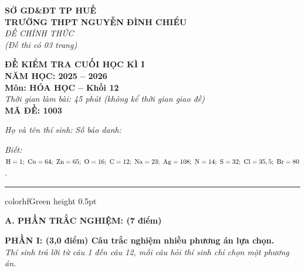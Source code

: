 \documentclass[11pt,a4paper]{article}
\begin{document}
\begin{minipage}[t]{0.48\textwidth}
\textbf{SỞ GD\&ĐT TP HUẾ}\\
\textbf{TRƯỜNG THPT NGUYỄN ĐÌNH CHIỂU}\\
\textit{ĐỀ CHÍNH THỨC}\\
\textit{(Đề thi có 03 trang)}
\end{minipage}
\hfill
\begin{minipage}[t]{0.48\textwidth}
\raggedleft
\textbf{\color{hfRed}ĐỀ KIỂM TRA CUỐI HỌC KÌ I}\\
\textbf{NĂM HỌC: 2025 -- 2026}\\
\textbf{Môn: HÓA HỌC -- Khối 12}\\
\textit{Thời gian làm bài: 45 phút (không kể thời gian giao đề)}\\
\textbf{MÃ ĐỀ: 1003}
\end{minipage}

\vspace{4pt}
\noindent
\textit{Họ và tên thí sinh:} \dotfill \textit{Số báo danh:} \dotfill

\vspace{3pt}
\noindent
\textit{\footnotesize Biết: $\ce{H}=1;\ \ce{Cu}=64;\ \ce{Zn}=65;\ \ce{O}=16;\ \ce{C}=12;\ \ce{Na}=23;\ \ce{Ag}=108;\ \ce{N}=14;\ \ce{S}=32;\ \ce{Cl}=35,5;\ \ce{Br}=80$.}

\vspace{3pt}
\hrule color{hfGreen} height 0.5pt

\vspace{4pt}
\noindent
{\color{mainGreen}\textbf{\Large A. PHẦN TRẮC NGHIỆM: (7 điểm)}}

\vspace{3pt}
\noindent
{\color{mainGreen}\textbf{\large PHẦN I: (3,0 điểm) Câu trắc nghiệm nhiều phương án lựa chọn.}}\\
\textit{\small Thí sinh trả lời từ câu 1 đến câu 12, mỗi câu hỏi thí sinh chỉ chọn một phương án.}
\vspace{2pt}
\end{document}

